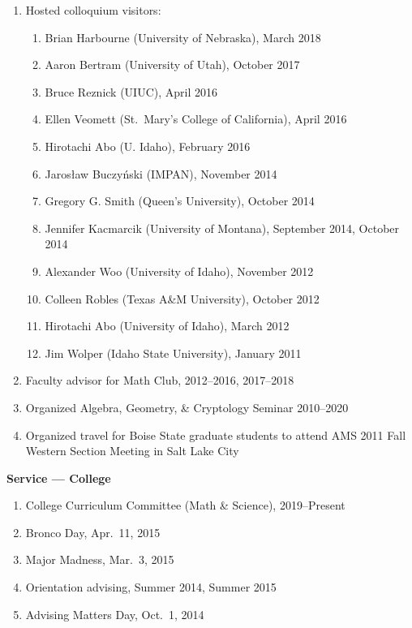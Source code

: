 \documentclass[12pt]{article}
\begin{document}
\begin{enumerate}[revarabic,labelwidth=*]
\item Hosted colloquium visitors:
\begin{enumerate}[revarabic,labelwidth=*]
\item Brian Harbourne (University of Nebraska), March 2018
\item Aaron Bertram (University of Utah), October 2017
\item Bruce Reznick (UIUC), April 2016
\item Ellen Veomett (St.\ Mary's College of California), April 2016
\item Hirotachi Abo (U. Idaho), February 2016
\item Jaros{\l}aw Buczy\'nski (IMPAN), November 2014
\item Gregory G. Smith (Queen's University), October 2014
\item Jennifer Kacmarcik (University of Montana), September 2014, October 2014 %
\item Alexander Woo (University of Idaho), November 2012
\item Colleen Robles (Texas A\&M University), October 2012
\item Hirotachi Abo (University of Idaho), March 2012
\item Jim Wolper (Idaho State University), January 2011
\end{enumerate}

\item Faculty advisor for Math Club, 2012--2016, 2017--2018

\item Organized Algebra, Geometry, \& Cryptology Seminar 2010--2020

\item Organized travel for Boise State graduate students to attend AMS 2011 Fall Western Section Meeting in Salt Lake City

\end{enumerate}

\textbf{Service --- College}
\begin{enumerate}[revarabic,labelwidth=*]
\item College Curriculum Committee (Math \& Science), 2019--Present

\item Bronco Day, Apr.\ 11, 2015
\item Major Madness, Mar.\ 3, 2015
\item Orientation advising, Summer 2014, Summer 2015
\item Advising Matters Day, Oct.\ 1, 2014
\end{enumerate}
\end{document}
